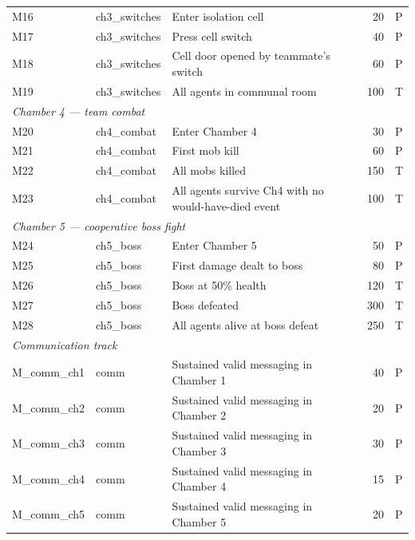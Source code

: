 \begin{table}[t]
\begin{tabular}{lllrl}
M16 & ch3\_switches & Enter isolation cell                     & 20   & P \\
M17 & ch3\_switches & Press cell switch                        & 40   & P \\
M18 & ch3\_switches & Cell door opened by teammate's switch    & 60   & P \\
M19 & ch3\_switches & All agents in communal room              & 100  & T \\
\midrule
\multicolumn{5}{l}{\emph{Chamber 4 --- team combat}} \\
M20 & ch4\_combat   & Enter Chamber 4                          & 30   & P \\
M21 & ch4\_combat   & First mob kill                           & 60   & P \\
M22 & ch4\_combat   & All mobs killed                          & 150  & T \\
M23 & ch4\_combat   & All agents survive Ch4 with no would-have-died event & 100  & T \\
\midrule
\multicolumn{5}{l}{\emph{Chamber 5 --- cooperative boss fight}} \\
M24 & ch5\_boss     & Enter Chamber 5                          & 50   & P \\
M25 & ch5\_boss     & First damage dealt to boss               & 80   & P \\
M26 & ch5\_boss     & Boss at 50\% health                      & 120  & T \\
M27 & ch5\_boss     & Boss defeated                            & 300  & T \\
M28 & ch5\_boss     & All agents alive at boss defeat          & 250  & T \\
\midrule
\multicolumn{5}{l}{\emph{Communication track}} \\
M\_comm\_ch1 & comm  & Sustained valid messaging in Chamber 1   & 40   & P \\
M\_comm\_ch2 & comm  & Sustained valid messaging in Chamber 2   & 20   & P \\
M\_comm\_ch3 & comm  & Sustained valid messaging in Chamber 3   & 30   & P \\
M\_comm\_ch4 & comm  & Sustained valid messaging in Chamber 4   & 15   & P \\
M\_comm\_ch5 & comm  & Sustained valid messaging in Chamber 5   & 20   & P \\
\bottomrule
\end{tabular}
\end{table}
